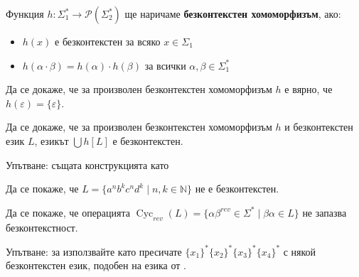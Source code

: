 \begin{definition}
    Функция $h : \Sigma_1^* \rightarrow \mathcal{P}(\Sigma_2^*)$ ще наричаме \textbf{безконтекстен хомоморфизъм}, ако:
    \begin{itemize}
        \item $h(x)$ е безконтекстен за всяко $x \in \Sigma_1$
        \item $h(\alpha \cdot \beta) = h(\alpha) \cdot h(\beta)$ за всички $\alpha, \beta \in \Sigma_1^*$
    \end{itemize}
\end{definition}

\begin{problem}
Да се докаже, че за произволен безконтекстен хомоморфизъм $h$ е вярно, че $h(\varepsilon) = \{ \varepsilon \}$.
\end{problem}

\begin{problem}
Да се докаже, че за произволен безконтекстен хомоморфизъм $h$ и безконтекстен език $L$, езикът $\bigcup h[L]$ е безконтекстен.

Упътване: същата конструкцията като 
\end{problem}

\begin{problem}
Да се покаже, че $L = \{ a^n b^k c^n d^k \mid n, k \in \mathbb{N} \}$ не е безконтекстен.
\end{problem}

\begin{problem}
Да се покаже, че операцията $\operatorname{Cyc}_{rev}(L) = \{ \alpha \beta^{rev} \in \Sigma^* \mid \beta \alpha \in L \}$ не запазва безконтекстност.

Упътване: за използвайте  като пресичате $\{ x_1 \}^* \{ x_2 \}^* \{ x_3 \}^* \{ x_4 \}^*$ с някой безконтекстен език, подобен на езика от .
\end{problem}